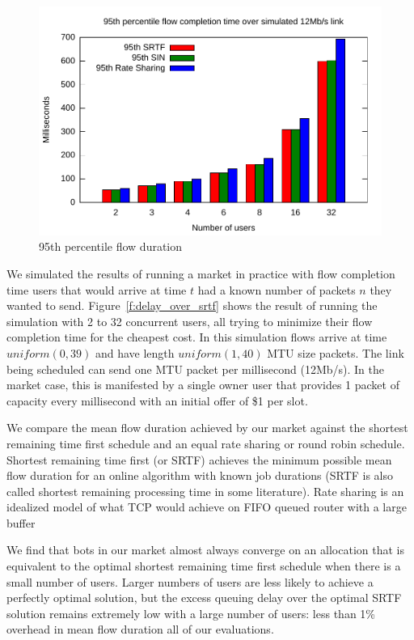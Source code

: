 \begin{figure}
\includegraphics[width=\columnwidth]{plots/95th_delay_over_srtf.pdf}
\caption{95th percentile flow duration}
\label{f:95th_delay_over_srtf}
\end{figure}

We simulated the results of running a market in practice with flow completion time users that would arrive at time $t$ had a known number of packets $n$ they wanted to send.
Figure~\ref{f:delay_over_srtf} shows the result of running the simulation with 2 to 32 concurrent users, all trying to minimize their flow completion time for the cheapest cost. In this simulation flows arrive at time $uniform(0, 39)$ and have length $uniform(1, 40)$ MTU size packets.
The link being scheduled can send one MTU packet per millisecond (12Mb/s). In the market case, this is manifested by a single owner user that provides 1 packet of capacity every millisecond with an initial offer of \$1 per slot.

We compare the mean flow duration achieved by our market against the shortest remaining time first schedule and an equal rate sharing or round robin schedule. Shortest remaining time first (or SRTF) achieves the minimum possible mean flow duration for an online algorithm with known job durations\cite{karger10,bansal01} (SRTF is also called shortest remaining processing time in some literature).
Rate sharing is an idealized model of what TCP would achieve on FIFO queued router with a large buffer

We find that bots in our market almost always converge on an allocation that is equivalent to the optimal shortest remaining time first schedule when there is a small number of users. Larger numbers of users are less likely to achieve a perfectly optimal solution, but the excess queuing delay over the optimal SRTF solution remains extremely low with a large number of users: less than 1\% overhead in mean flow duration all of our evaluations.

